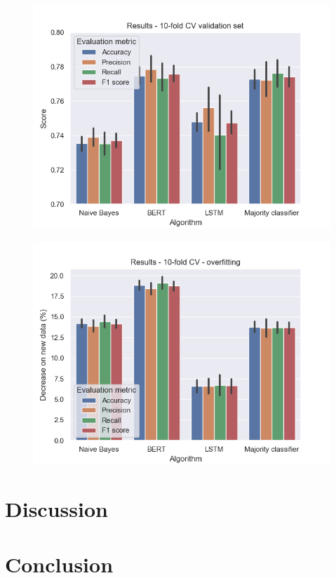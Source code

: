 \documentclass[conference]{IEEEtran}
\begin{document}
\begin{figure}[hbt!]\centering
\centering
\includegraphics[width=\linewidth]{cv-test}
\caption{}
\label{pic6}
\end{figure}

\begin{figure}[hbt!]\centering
\centering
\includegraphics[width=\linewidth]{cv-overfitting}
\caption{}
\label{pic7}
\end{figure}


\section{Discussion}

\section{Conclusion}
\end{document}
